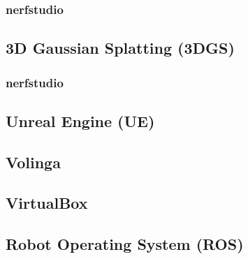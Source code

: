 \documentclass[a4paper, 12pt, spanish, twoside]{article}
\begin{document}
\subsubsection{nerfstudio} \label{sec:herramientas:nerf:nerfstudio}


\subsection{3D Gaussian Splatting (3DGS)} \label{sec:herramientas:3dgs}

\subsubsection{nerfstudio} \label{sec:herramientas:3dgs:nerfstudio}


\subsection{Unreal Engine (UE)} \label{sec:herramientas:ue}


\subsection{Volinga} \label{sec:herramientas:volinga}


\subsection{VirtualBox} \label{sec:herramientas:virtualbox}


\subsection{Robot Operating System (ROS)} \label{sec:herramientas:ros}
\end{document}
